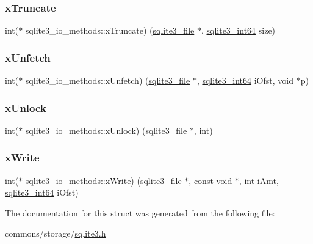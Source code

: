 \mbox{\label{structsqlite3__io__methods_abe797948913bfe94d4fab7246773af50}} 
\subsubsection{\texorpdfstring{xTruncate}{xTruncate}}
{\footnotesize\ttfamily int($\ast$ sqlite3\+\_\+io\+\_\+methods\+::x\+Truncate) (\mbox{\hyperlink{structsqlite3__file}{sqlite3\+\_\+file}} $\ast$, \mbox{\hyperlink{sqlite3_8h_a0a4d3e6c1ad46f90e746b920ab6ca0d2}{sqlite3\+\_\+int64}} size)}

\mbox{\label{structsqlite3__io__methods_abebf1bbaa50bea56f0e37d0f66193bda}} 
\subsubsection{\texorpdfstring{xUnfetch}{xUnfetch}}
{\footnotesize\ttfamily int($\ast$ sqlite3\+\_\+io\+\_\+methods\+::x\+Unfetch) (\mbox{\hyperlink{structsqlite3__file}{sqlite3\+\_\+file}} $\ast$, \mbox{\hyperlink{sqlite3_8h_a0a4d3e6c1ad46f90e746b920ab6ca0d2}{sqlite3\+\_\+int64}} i\+Ofst, void $\ast$p)}

\mbox{\label{structsqlite3__io__methods_a5ce75a5ca2df9c1edcaef74d4c0d7e38}} 
\subsubsection{\texorpdfstring{xUnlock}{xUnlock}}
{\footnotesize\ttfamily int($\ast$ sqlite3\+\_\+io\+\_\+methods\+::x\+Unlock) (\mbox{\hyperlink{structsqlite3__file}{sqlite3\+\_\+file}} $\ast$, int)}

\mbox{\label{structsqlite3__io__methods_a659f6a40777b685c6a6b80e5f07a3328}} 
\subsubsection{\texorpdfstring{xWrite}{xWrite}}
{\footnotesize\ttfamily int($\ast$ sqlite3\+\_\+io\+\_\+methods\+::x\+Write) (\mbox{\hyperlink{structsqlite3__file}{sqlite3\+\_\+file}} $\ast$, const void $\ast$, int i\+Amt, \mbox{\hyperlink{sqlite3_8h_a0a4d3e6c1ad46f90e746b920ab6ca0d2}{sqlite3\+\_\+int64}} i\+Ofst)}



The documentation for this struct was generated from the following file\+:\begin{DoxyCompactItemize}
\item 
commons/storage/\mbox{\hyperlink{sqlite3_8h}{sqlite3.\+h}}\end{DoxyCompactItemize}
